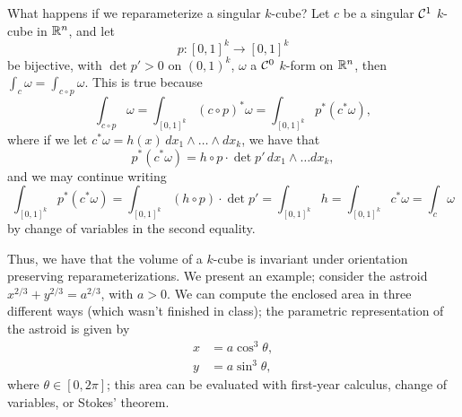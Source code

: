 \begin{remark}
    What happens if we reparameterize a singular $k$-cube? Let $c$ be a singular $\mathcal C^1$ $k$-cube in $\mathbb R^n$, and let
    \[ p : [0, 1]^k \to [0, 1]^k \]
    be bijective, with $\det p' > 0$ on $(0, 1)^k$, $\omega$ a $\mathcal C^0$ $k$-form on $\mathbb R^n$, then $\int_c \omega = \int_{c \circ p} \omega$. This is true because
    \[ \int_{c \circ p} \omega = \int_{[0, 1]^k} (c \circ p)^\ast \omega = \int_{[0, 1]^k} p^\ast(c^\ast \omega), \]
    where if we let $c^\ast \omega = h(x) \, dx_1 \wedge \dots \wedge dx_k$, we have that
    \[ p^\ast (c^\ast \omega) = h \circ p \cdot \det p' \, dx_1 \wedge \dots dx_k, \]
    and we may continue writing
    \[ \int_{[0, 1]^k} p^\ast(c^\ast \omega) = \int_{[0, 1]^k} (h \circ p) \cdot \det p' = \int_{[0, 1]^k} h = \int_{[0, 1]^k} c^\ast \omega = \int_c \omega \]
    by change of variables in the second equality.
\end{remark}
\noindent Thus, we have that the volume of a $k$-cube is invariant under orientation preserving reparameterizations. We present an example; consider the astroid $x^{2/3} + y^{2/3} = a^{2/3}$, with $a > 0$. We can compute the enclosed area in three different ways (which wasn't finished in class); the parametric representation of the astroid is given by
\begin{align*}
    x &= a \cos^3 \theta, \\
    y &= a \sin^3 \theta,
\end{align*}
where $\theta \in [0, 2\pi]$; this area can be evaluated with first-year calculus, change of variables, or Stokes' theorem.